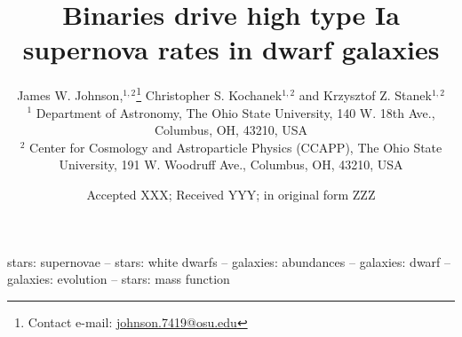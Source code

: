 \documentclass[fleqn, usenatbib]{mnras}
\title[Type Ia supernova rates]{Binaries drive high type Ia supernova rates in
dwarf galaxies}
\author[J.W. Johnson, C.S. Kochanek \& K.Z. Stanek]{
	James W. Johnson,$^{1, 2}$\thanks{
		Contact e-mail: \href{mailto:johnson.7419@osu.edu}{johnson.7419@osu.edu}
	}
	Christopher S. Kochanek$^{1, 2}$ and
	Krzysztof Z. Stanek$^{1, 2}$
	\\
	$^{1}$ Department of Astronomy, The Ohio State University,
	140 W. 18th Ave., Columbus, OH, 43210, USA
	\\
	$^{2}$ Center for Cosmology and Astroparticle Physics (CCAPP),
	The Ohio State University, 191 W. Woodruff Ave., Columbus, OH, 43210, USA
}
\date{Accepted XXX; Received YYY; in original form ZZZ}
\begin{document}
\label{firstpage}
\pagerange{\pageref{firstpage}--\pageref{lastpage}}
\maketitle



\begin{keywords}
stars: supernovae -- stars: white dwarfs -- galaxies: abundances -- galaxies:
dwarf -- galaxies: evolution -- stars: mass function
\end{keywords}




% 







\label{lastpage}
\end{document}
